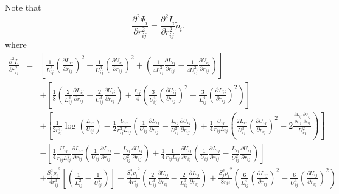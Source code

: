 \documentclass[12pt]{article}
\begin{document}
Note that
\begin{equation}
\frac{\partial^{2}{\Psi}_{i}}{\partial r_{ij}^{2}} = \frac{\partial^{2}I_{i}}{\partial r_{ij}^{2}}{\tilde{\rho}_{i}}.
\end{equation}
where
\begin{eqnarray}
\label{eq:BurialTerm2ndDerv}
\frac{\partial^{2}I_{i}}{\partial r_{ij}^{2}} & = & \left[ \frac{1}{L_{ij}^{3}}\left(\frac{\partial L_{ij}}{\partial r_{ij}}\right)^{2}
- \frac{1}{U_{ij}^{3}}\left(\frac{\partial U_{ij}}{\partial r_{ij}}\right)^{2} + \left(\frac{1}{4L_{ij}^{3}}\frac{\partial L_{ij}}{\partial r_{ij}} - \frac{1}{4U_{ij}^{3}}\frac{\partial U_{ij}}{\partial r_{ij}} \right)\right] \\ \nonumber
& & +  \left[ \frac{1}{8}\left(\frac{2}{L_{ij}^{3}} \frac{\partial L_{ij}}{\partial r_{ij}} - \frac{2}{U_{ij}^{3}} \frac{\partial U_{ij}}{\partial r_{ij}} \right) + \frac{r_{ij}}{4}\left(\frac{3}{U_{ij}^{4}}\left(\frac{\partial U_{ij}}{\partial r_{ij}} \right)^{2}    - \frac{3}{L_{ij}^{4}}\left(\frac{\partial L_{ij}}{\partial r_{ij}} \right)^{2} \right)\right] \\ \nonumber
& & + \left[ \frac{1}{2r_{ij}^{3}}\log(\frac{L_{ij}}{U_{ij}}) - \frac{1}{2} \frac{U_{ij}}{r_{ij}^{2}L_{ij}} \left( \frac{1}{U_{ij}}\frac{\partial L_{ij}}{\partial r_{ij}} - \frac{L_{ij}}{U_{ij}^{2}}\frac{\partial U_{ij}}{\partial r_{ij}} \right)
+\frac{1}{4}\frac{U_{ij}}{r_{ij}L_{ij}}\left(\frac{2L_{ij}}{U_{ij}^{3}}\left(\frac{\partial U_{ij}}{\partial r_{ij}}\right)^{2} - 2\frac{\frac{\partial L_{ij}}{\partial r_{ij}}\frac{\partial U_{ij}}{\partial r_{ij}}}{U_{ij}^{2}} \right) \right] \\ \nonumber
& & - \left[ \frac{1}{4}\frac{U_{ij}}{r_{ij}L_{ij}^2}\frac{\partial L_{ij}}{\partial r_{ij}}\left( \frac{1}{U_{ij}}\frac{\partial L_{ij}}{\partial r_{ij}} - \frac{L_{ij}}{U_{ij}^{2}}\frac{\partial U_{ij}}{\partial r_{ij}} \right) +  \frac{1}{4}\frac{1}{r_{ij}L_{ij}}\frac{\partial U_{ij}}{\partial r_{ij}}\left(\frac{1}{U_{ij}}\frac{\partial L_{ij}}{\partial r_{ij}} - \frac{L_{ij}}{U_{ij}^{2}}\frac{\partial U_{ij}}{\partial r_{ij}} \right) \right] \\ \nonumber
& & + \frac{S_{j}^{2}{{\tilde{\rho}_{i}}}^{2}}{4r_{ij}^{3}}\left[\left(\frac{1}{L_{ij}^2} - \frac{1}{U_{ij}^2} \right) \right]
-\frac{S_{j}^{2}{{\tilde{\rho}_{i}}}^{2}}{4r_{ij}^{2}}\left( \frac{2}{U_{ij}^{3}}\frac{\partial U_{ij}}{\partial r_{ij}}
- \frac{2}{L_{ij}^{3}}\frac{\partial L_{ij}}{\partial r_{ij}}\right) + \frac{S_{j}^{2}{{\tilde{\rho}_{i}}}^{2}}{8r_{ij}}\left(\frac{6}{L_{ij}^{4}} \left(\frac{\partial L_{ij}}{\partial r_{ij}} \right)^{2} - \frac{6}{U_{ij}^{4}} \left(\frac{\partial U_{ij}}{\partial r_{ij}} \right)^{2} \right)
\end{eqnarray}
\end{document}
